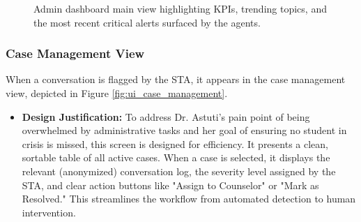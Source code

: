 \begin{figure}[h]
    \caption{Admin dashboard main view highlighting KPIs, trending topics, and the most recent critical alerts surfaced by the agents.}
    \label{fig:ui_admin_dashboard}
\end{figure}

\subsubsection{Case Management View}
When a conversation is flagged by the STA, it appears in the case management view, depicted in Figure \ref{fig:ui_case_management}.
\begin{itemize}
    \item \textbf{Design Justification:} To address Dr. Astuti's pain point of being overwhelmed by administrative tasks and her goal of ensuring no student in crisis is missed, this screen is designed for efficiency. It presents a clean, sortable table of all active cases. When a case is selected, it displays the relevant (anonymized) conversation log, the severity level assigned by the STA, and clear action buttons like "Assign to Counselor" or "Mark as Resolved." This streamlines the workflow from automated detection to human intervention.
\end{itemize}

